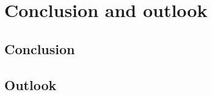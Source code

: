 \chapter{Conclusion and outlook}
\label{ch:conclusion}

\section{Conclusion}
\label{sec:conclusion}

\section{Outlook}
\label{sec:outlook}
